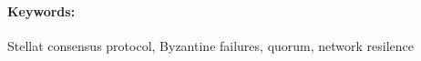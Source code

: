 \documentclass[12pt, twoside]{book}
\begin{document}
\paragraph*{Keywords:}  Stellat consensus protocol, Byzantine failures,
quorum, network resilence


%
%



\newpage 

\tableofcontents



\newpage 

\listoffigures


\mainmatter


 















\newpage	

\backmatter

\thispagestyle{empty}
\nocite{*}
\clearpage




 
\end{document}
